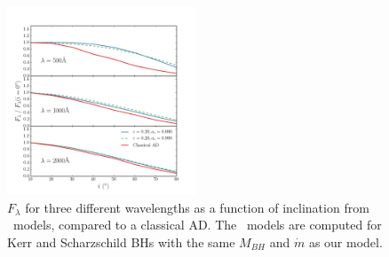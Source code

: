 \documentclass[useAMS,usenatbib]{mn2e_x}
\begin{document}





\begin{figure}
\centering
\includegraphics[width=0.5\textwidth]{figures/agnspec.png}
\caption
{
$F_\lambda$ for three different wavelengths
as a function of inclination from \agn\ models, 
compared to a classical AD. 
The \agn\ models are computed for Kerr and Scharzschild
BHs with the same $M_{BH}$ and $\dot{m}$ as our model.
}
\label{fig:f2000}
\end{figure}

\end{document}

